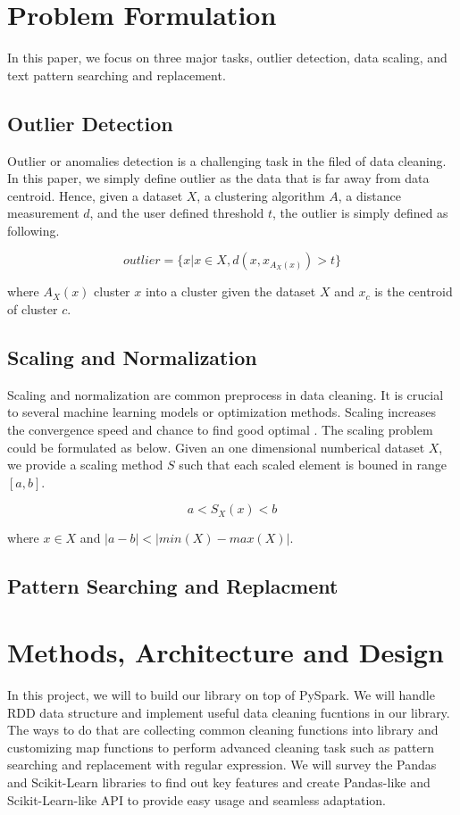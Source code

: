 \documentclass[sigconf]{acmart}
\begin{document}
\section{Problem Formulation}
In this paper, we focus on three major tasks, outlier detection, data scaling, and text pattern searching and replacement.
\subsection{Outlier Detection}
Outlier or anomalies detection is a challenging task in the filed of data cleaning\cite{anomal}. In this paper, we simply define outlier as the data that is far away from data centroid. Hence, given a dataset $X$, a clustering algorithm $A$, a distance measurement $d$, and the user defined threshold $t$, the outlier is simply defined as following.

\[ outlier = \{x | x \in X, d( x, x_{A_X(x)} ) > t \}  \]

where $A_X(x)$ cluster $x$ into a cluster given the dataset $X$ and $x_c$  is the centroid of cluster $c$.

\subsection{Scaling and Normalization}
Scaling and normalization are common preprocess in data cleaning. It is crucial to several machine learning models or optimization methods. Scaling increases the convergence speed and chance to find good optimal \cite{convex}. The scaling problem could be formulated as below.
Given an one dimensional numberical dataset $X$, we provide a scaling method $S$ such that each scaled element is bouned in range $[a, b]$.

\[ a < S_X(x) < b\] 

where $x \in X$ and $|a - b| < |min(X) - max(X)|$.

\subsection{Pattern Searching and Replacment}

\section{Methods, Architecture and Design}
In this project, we will to build our library on top of PySpark\cite{pyspark, spark}. We will handle RDD data structure and implement useful data cleaning fucntions in our library. The ways to do that are collecting common cleaning functions into library and customizing map functions to perform advanced cleaning task such as pattern searching and replacement with regular expression. We will survey the Pandas\cite{pandas} and Scikit-Learn\cite{scikit-learn} libraries to find out key features and create Pandas-like and Scikit-Learn-like API to provide easy usage and seamless adaptation.
\end{document}

